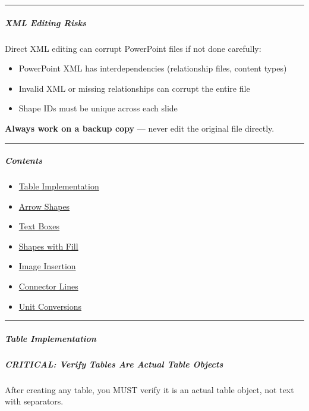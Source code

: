 \documentclass[11pt]{article}
\begin{document}
\vspace{0.5em}\hrule\vspace{0.5em}

\subparagraph{XML Editing Risks}\mbox{}\par

Direct XML editing can corrupt PowerPoint files if not done carefully:

\begin{itemize}[leftmargin=*,itemsep=2pt,topsep=2pt]
\item {} PowerPoint XML has interdependencies (relationship files, content types)
\item {} Invalid XML or missing relationships can corrupt the entire file
\item {} Shape IDs must be unique across each slide
\end{itemize}

\textbf{Always work on a backup copy} — never edit the original file directly.


\vspace{0.5em}\hrule\vspace{0.5em}

\subparagraph{Contents}\mbox{}\par
\begin{itemize}[leftmargin=*,itemsep=2pt,topsep=2pt]
\item {} \href{\#table-implementation}{Table Implementation}
\item {} \href{\#arrow-shapes}{Arrow Shapes}
\item {} \href{\#text-boxes}{Text Boxes}
\item {} \href{\#shapes-with-fill}{Shapes with Fill}
\item {} \href{\#image-insertion}{Image Insertion}
\item {} \href{\#connector-lines}{Connector Lines}
\item {} \href{\#unit-conversions}{Unit Conversions}
\end{itemize}

\vspace{0.5em}\hrule\vspace{0.5em}

\subparagraph{Table Implementation}\mbox{}\par

\subparagraph{CRITICAL: Verify Tables Are Actual Table Objects}\mbox{}\par

After creating any table, you MUST verify it is an actual table object, not text with separators.
\end{document}

